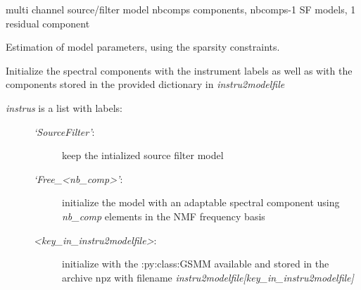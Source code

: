 \documentclass[letterpaper,10pt,english]{sphinxmanual}
\begin{document}
\begin{fulllineitems}
\label{reference/audiomodel:pyfasst.audioModel.multiChanSourceF0Filter}
multi channel source/filter model
nbcomps components, nbcomps-1 SF models, 1 residual component

\begin{fulllineitems}
\label{reference/audiomodel:pyfasst.audioModel.multiChanSourceF0Filter.estim_param_a_post_model}
Estimation of model parameters, using the sparsity constraints.

\end{fulllineitems}


\begin{fulllineitems}
\label{reference/audiomodel:pyfasst.audioModel.multiChanSourceF0Filter.initSpecCompsWithLabelAndFiles}
Initialize the spectral components with the instrument labels as
well as with the components stored in the provided dictionary in
\emph{instru2modelfile}
\begin{description}
\item[{\emph{instrus} is a list with labels:}] \leavevmode\begin{description}
\item[{\emph{`SourceFilter'}:}] \leavevmode
keep the intialized source filter model

\item[{\emph{`Free\_\textless{}nb\_comp\textgreater{}'}:}] \leavevmode
initialize the model with an adaptable
spectral component using \emph{nb\_comp} elements in the NMF
frequency basis

\item[{\emph{\textless{}key\_in\_instru2modelfile\textgreater{}}:}] \leavevmode
initialize with the :py:class:GSMM
available and stored in the archive npz with filename
\emph{instru2modelfile{[}key\_in\_instru2modelfile{]}}


\end{description}
\end{description}
\end{fulllineitems}
\end{fulllineitems}
\end{document}
